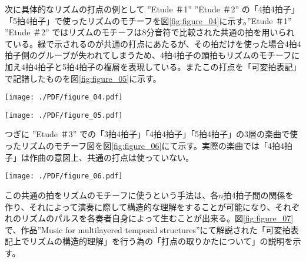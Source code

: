 \documentclass[uplatex,dvipdfmx]{ujarticle}
\begin{document}
次に具体的なリズムの打点の例として ''Etude ＃1'' ''Etude ＃2'' の「4拍4拍子」「5拍4拍子」で使ったリズムのモチーフを図\ref{fig:figure_04}に示す。''Etude ＃1'' ''Etude ＃2'' ではリズムのモチーフは8分音符で比較された共通の拍を用いられている。緑で示されるのが共通の打点にあたるが、その拍だけを使った場合4拍4拍子側のグルーブが失われてしまうため、4拍4拍子の頭拍もリズムのモチーフに加え4拍4拍子と5拍4拍子の複層を表現している。またこの打点を「可変拍表記」で記譜したものを図\ref{fig:figure_05}に示す。

\begin{figure*}[htb]
\centerline{
	\texttt{[image: ./PDF/figure\_04.pdf]}
}
\caption{''Etude ＃1'' ''Etude ＃2'' リズムモチーフ図。図の上が4拍4拍子の8分音符の打点を示している。下が5拍4拍子の8分音符の打点を示している。それぞれの緑のラインがそれぞれの共通の打点を示している。赤いラインはリズムのモチーフとして恣意的に追加された打点を示している。ラインの下に表記さている数字は、それぞれの打点の位置を数値化して示したもの}
\label{fig:figure_04}
\end{figure*}

\begin{figure*}[htb]
\centerline{
	\texttt{[image: ./PDF/figure\_05.pdf]}
}
\caption{図\ref{fig:figure_04}を可変拍表記で示した例}
\label{fig:figure_05}
\end{figure*}

つぎに ''Etude ＃3'' での「3拍4拍子」「4拍4拍子」「5拍4拍子」の3層の楽曲で使ったリズムのモチーフ図を図\ref{fig:figure_06}にて示す。実際の楽曲では「4拍4拍子」は作曲の意図上、共通の打点は使っていない。

\begin{figure*}[htb]
\centerline{
	\texttt{[image: ./PDF/figure\_06.pdf]}
}
\caption{''Etude ＃3'' リズムモチーフ図。上から3拍4拍子、4拍4拍子、5拍4拍子の4分音符での打点を示している。赤が3つの拍子に共通する打点、オレンジが3拍4拍子と4拍4拍子に共通する打点、緑が4拍4拍子と5拍4拍子に共通する打点、青が3拍4拍子と5拍4拍子に共通する打点を示している。図版の表示上見えないが、図\ref{fig:figure_04}と同じように各打点の下には数値化した打点の位置が示されている}
\label{fig:figure_06}
\end{figure*}

この共通の拍をリズムのモチーフに使うという手法は、各$ n $拍4拍子間の関係を作り、それによって演奏に際して構造的な理解をすることが可能になり、それぞれのリズムのパルスを各奏者自身によって生むことが出来る。図\ref{fig:figure_07}で、作品''Music for multilayered temporal structures''にて解説された「可変拍表記上でリズムの構造的理解」を行う為の「打点の取りかたについて」の説明を示す。
\end{document}

